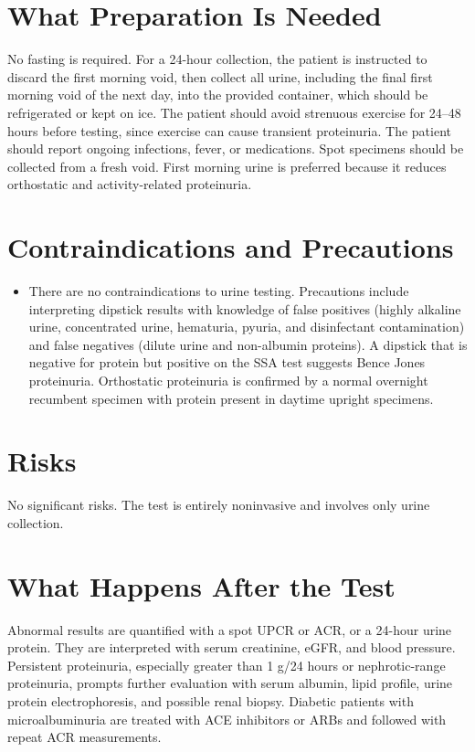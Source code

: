 \section*{What Preparation Is Needed}
No fasting is required. For a 24-hour collection, the patient is instructed to discard the first morning void, then collect all urine, including the final first morning void of the next day, into the provided container, which should be refrigerated or kept on ice. The patient should avoid strenuous exercise for 24--48 hours before testing, since exercise can cause transient proteinuria. The patient should report ongoing infections, fever, or medications. Spot specimens should be collected from a fresh void. First morning urine is preferred because it reduces orthostatic and activity-related proteinuria.
\section*{Contraindications and Precautions}
\begin{itemize}
  \item There are no contraindications to urine testing. Precautions include interpreting dipstick results with knowledge of false positives (highly alkaline urine, concentrated urine, hematuria, pyuria, and disinfectant contamination) and false negatives (dilute urine and non-albumin proteins). A dipstick that is negative for protein but positive on the SSA test suggests Bence Jones proteinuria. Orthostatic proteinuria is confirmed by a normal overnight recumbent specimen with protein present in daytime upright specimens.
\end{itemize}
\section*{Risks}
No significant risks. The test is entirely noninvasive and involves only urine collection.
\section*{What Happens After the Test}
Abnormal results are quantified with a spot UPCR or ACR, or a 24-hour urine protein. They are interpreted with serum creatinine, eGFR, and blood pressure. Persistent proteinuria, especially greater than 1 g/24 hours or nephrotic-range proteinuria, prompts further evaluation with serum albumin, lipid profile, urine protein electrophoresis, and possible renal biopsy. Diabetic patients with microalbuminuria are treated with ACE inhibitors or ARBs and followed with repeat ACR measurements.
